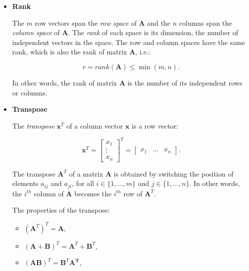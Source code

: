 \documentclass[10pt,b5paper,titlepage]{book}
\begin{document}
\begin{itemize}
    \item \textbf{Rank}

        The $m$ row vectors span the \textit{row space} of $\mathbf{A}$ and the
        $n$ columns span the \textit{column space} of $\mathbf{A}$. The \textit{rank}
        of each space is its dimension, the number of independent vectors in the
        space. The row and column spaces have the same rank, which is also the
        rank of matrix $\mathbf{A}$, i.e.:

        \begin{equation}
            r = rank(\mathbf{A}) \le \min(m, n)
        .\end{equation}

        In other words, the rank of matrix $\mathbf{A}$ is the number of its
        independent rows or columns.

     \item \textbf{Transpose}

        The \textit{transpose} $\mathbf{x}^{T}$ of a column vector $\mathbf{x}$
        is a row vector:

        \begin{equation}
            \mathbf{x}^{T} = \begin{bmatrix} x_1\\ \vdots\\ x_n \end{bmatrix}^{T}
            = \begin{bmatrix} x_1 & \ldots & x_n \end{bmatrix}
        .\end{equation}

        The transpose $\mathbf{A}^{T}$ of a matrix $\mathbf{A}$ is obtained
        by switching the position of elements $a_{ij}$ and $a_{ji}$,
        for all $i \in \{1, \ldots, m\}$ and $j \in \{1, \ldots, n\}$.
        In other words, the $i^{th}$ column of $\mathbf{A}$ becomes the
        $i^{th}$ row of $\mathbf{A}^{T}$.

        The properties of the transpose:

        \begin{itemize}
            \item $(\mathbf{A}^{T})^{T} = \mathbf{A}$,

            \item $(\mathbf{A} + \mathbf{B})^{T} = \mathbf{A}^{T} + \mathbf{B}^{T}$,

            \item $(\mathbf{A}\mathbf{B})^{T} = \mathbf{B}^{T}\mathbf{A^{T}}$,


\end{itemize}
\end{itemize}
\end{document}
